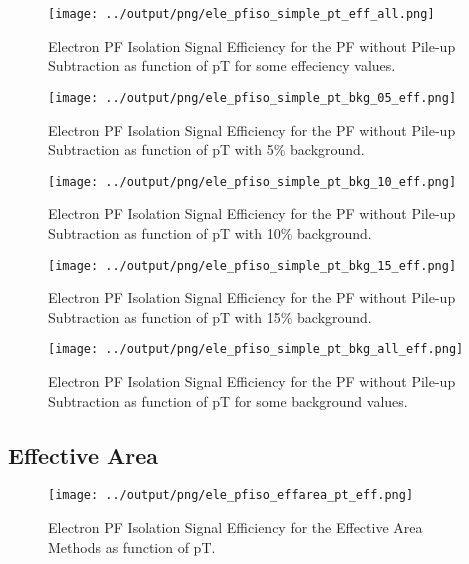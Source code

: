 \documentclass[11pt]{book}
\begin{document}
\begin{figure}[htb]
\centering
\texttt{[image: ../output/png/ele\_pfiso\_simple\_pt\_eff\_all.png]}
\caption{Electron PF Isolation Signal Efficiency for the PF without Pile-up Subtraction as function of pT for some effeciency values.}
\label{fig:ele_pfiso_pt_eff_simple_eff_all}
\end{figure}

\begin{figure}[htb]
\centering
\texttt{[image: ../output/png/ele\_pfiso\_simple\_pt\_bkg\_05\_eff.png]}
\caption{Electron PF Isolation Signal Efficiency for the PF without Pile-up Subtraction as function of pT with 5\% background.}
\label{fig:ele_pfiso_pt_bkg_simple_bkg_05_eff}
\end{figure}

\begin{figure}[htb]
\centering
\texttt{[image: ../output/png/ele\_pfiso\_simple\_pt\_bkg\_10\_eff.png]}
\caption{Electron PF Isolation Signal Efficiency for the PF without Pile-up Subtraction as function of pT with 10\% background.}
\label{fig:ele_pfiso_pt_bkg_simple_bkg_10_eff}
\end{figure}

\begin{figure}[htb]
\centering
\texttt{[image: ../output/png/ele\_pfiso\_simple\_pt\_bkg\_15\_eff.png]}
\caption{Electron PF Isolation Signal Efficiency for the PF without Pile-up Subtraction as function of pT with 15\% background.}
\label{fig:ele_pfiso_pt_bkg_simple_bkg_15_eff}
\end{figure}

\begin{figure}[htb]
\centering
\texttt{[image: ../output/png/ele\_pfiso\_simple\_pt\_bkg\_all\_eff.png]}
\caption{Electron PF Isolation Signal Efficiency for the PF without Pile-up Subtraction as function of pT for some background values.}
\label{fig:ele_pfiso_pt_bkg_simple_bkg_all_eff}
\end{figure}
\clearpage

\subsection{Effective Area}

\begin{figure}[htb]
\centering
\texttt{[image: ../output/png/ele\_pfiso\_effarea\_pt\_eff.png]}
\caption{Electron PF Isolation Signal Efficiency for the Effective Area Methods as function of pT.}
\label{fig:ele_pfiso_pt_eff_effarea}
\end{figure}
\end{document}
